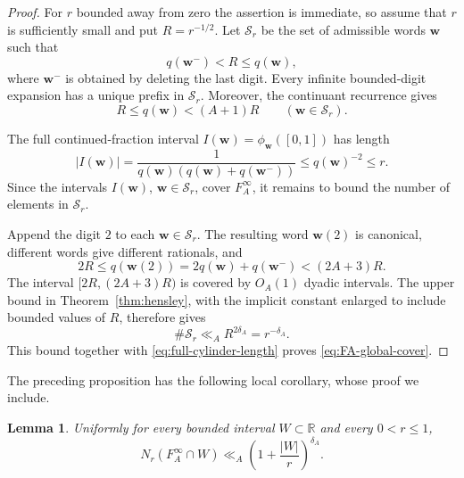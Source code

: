 \documentclass[11pt]{amsart}
\newtheorem{lemma}[theorem]{Lemma}
\newcommand{\R}{\mathbb R}
\begin{document}
\begin{proof}
For $r$ bounded away from zero the assertion is immediate, so assume that
$r$ is sufficiently small and put $R=r^{-1/2}$.  Let $\mathcal S_r$ be the
set of admissible words $\mathbf{w}$ such that
\begin{equation}\label{eq:stopping-denominator}
 q(\mathbf{w}^{-})<R\le q(\mathbf{w}),
\end{equation}
where $\mathbf{w}^{-}$ is obtained by deleting the last digit.  Every infinite
bounded-digit expansion has a unique prefix in $\mathcal S_r$.  Moreover, the
continuant recurrence gives
\begin{equation}\label{eq:stopping-denominator-size}
 R\le q(\mathbf{w})< (A+1)R
 \qquad(\mathbf{w}\in\mathcal S_r).
\end{equation}

The full continued-fraction interval $I(\mathbf{w})=\phi_{\mathbf{w}}([0,1])$ has length
\begin{equation}\label{eq:full-cylinder-length}
 |I(\mathbf{w})|=\frac1{q(\mathbf{w})(q(\mathbf{w})+q(\mathbf{w}^{-}))}\le q(\mathbf{w})^{-2}\le r.
\end{equation}
Since the intervals $I(\mathbf{w})$, $\mathbf{w}\in\mathcal S_r$, cover $F_A^\infty$, it remains
to bound the number of elements in $\mathcal S_r$.

Append the digit $2$ to each $\mathbf{w}\in\mathcal S_r$.  The resulting word $\mathbf{w}(2)$ is
canonical, different words give different rationals, and
$$
 2R\le q(\mathbf{w}(2))=2q(\mathbf{w})+q(\mathbf{w}^{-})<(2A+3)R.
$$
The interval $[2R,(2A+3)R)$ is covered by $O_A(1)$ dyadic intervals.
The upper bound in Theorem~\ref{thm:hensley}, with the implicit constant
enlarged to include bounded values of $R$, therefore gives
$$
 \#\mathcal S_r\ll_A R^{2\delta_A}=r^{-\delta_A}.
$$
This bound together with \eqref{eq:full-cylinder-length} proves
\eqref{eq:FA-global-cover}.
\end{proof}

The preceding proposition has the following local corollary, whose proof we include.

\begin{lemma}\label{lem:FA-regularity}
Uniformly for every bounded interval $W\subset\R$ and every $0<r\le1$,
\begin{equation}\label{eq:FA-cover}
 N_r(F_A^\infty\cap W)
 \ll_A \left(1+\frac{|W|}{r}\right)^{\delta_A}.
\end{equation}
\end{lemma}
\end{document}
